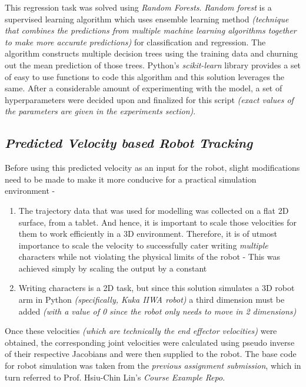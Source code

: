 \documentclass[a4paper]{article}
\begin{document}
This regression task was solved using {\it Random Forests}. {\it Random forest} is a supervised learning algorithm which uses ensemble learning method {\it (technique that combines the predictions from multiple machine learning algorithms together to make more accurate predictions)} for classification and regression. The algorithm constructs multiple decision trees using the training data and churning out the mean prediction of those trees. Python's {\it scikit-learn} library provides a set of easy to use functions to code this algorithm and this solution leverages the same. After a considerable amount of experimenting with the model, a set of hyperparameters were decided upon and finalized for this script {\it (exact values of the parameters are given in the experiments section)}.


\subsection{\it \textbf{Predicted Velocity based Robot Tracking}}

Before using this predicted velocity as an input for the robot, slight modifications need to be made to make it more conducive for a practical simulation environment - 
\begin{enumerate}
    \item The trajectory data that was used for modelling was collected on a flat 2D surface, from a tablet. And hence, it is important to scale those velocities for them to work efficiently in a 3D environment. Therefore, it is of utmost importance to scale the velocity to successfully cater writing {\it multiple} characters while not violating the physical limits of the robot - This was achieved simply by scaling the output by a constant
    \item Writing characters is a 2D task, but since this solution simulates a 3D robot arm in Python {\it (specifically, Kuka IIWA robot)} a third dimension must be added {\it (with a value of 0 since the robot only needs to move in 2 dimensions)}
\end{enumerate}
Once these velocities {\it (which are technically the end effector velocities)} were obtained, the corresponding joint velocities were calculated using pseudo inverse of their respective Jacobians and were then supplied to the robot. The base code for robot simulation was taken from the {\it previous assignment submission}, which in turn referred to Prof. Hsiu-Chin Lin's {\it Course Example Repo}.
\end{document}
